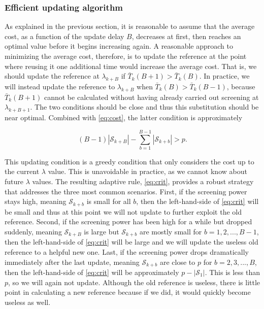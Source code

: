 \subsubsection{Efficient updating algorithm}

As explained in the previous section, it is reasonable to assume that the average cost, as a function of the update delay $B$, decreases at first, then reaches an optimal value before it begins increasing again. A reasonable approach to minimizing the average cost, therefore, is to update the reference at the point where reusing it one additional time would increase the average cost. That is, we should update the reference at $\lambda_{k+B}$ if $\bar{T}_k(B+1)>\bar{T}_k(B)$. In practice, we will instead update the reference to $\lambda_{k+B}$ when $\bar{T}_k(B)>\bar{T}_k(B-1)$, because $\bar{T}_k(B+1)$ cannot be calculated without having already carried out screening at $\lambda_{k+B+1}$. The two conditions should be close and thus this substitution should be near optimal. Combined with \eqref{eq:cost}, the latter condition is approximately

\begin{equation}
    \label{eq:crit}
    (B-1)|\mathcal{S}_{k+B}|-\sum_{b=1}^{B-1}|\mathcal{S}_{k+b}|>p.
\end{equation}


This updating condition is a greedy condition that only considers the cost up to the current $\lambda$ value. This is unavoidable in practice, as we cannot know about future $\lambda$ values. The resulting adaptive rule, \eqref{eq:crit}, provides a robust strategy that addresses the three most common scenarios. First, if the screening power stays high, meaning $\mathcal{S}_{k+b}$ is small for all $b$, then the left-hand-side of \eqref{eq:crit} will be small and thus at this point we will not update to further exploit the old reference. Second, if the screening power has been high for a while but dropped suddenly, meaning $\mathcal{S}_{k+B}$ is large but $\mathcal{S}_{k+b}$ are mostly small for $b=1,2,...,B-1$, then the left-hand-side of \eqref{eq:crit} will be large and we will update the useless old reference to a helpful new one. Last, if the screening power drops dramatically immediately after the last update, meaning $\mathcal{S}_{k+b}$ are close to $p$ for $b=2,3,...,B$, then the left-hand-side of \eqref{eq:crit} will be approximately $p-|\mathcal{S}_1|$. This is less than $p$, so we will again not update.  Although the old reference is useless, there is little point in calculating a new reference because if we did, it would quickly become useless as well.

